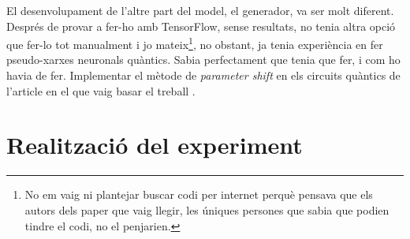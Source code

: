 El desenvolupament de l'altre part del model, el generador, va ser molt diferent. Després de provar a fer-ho amb TensorFlow, sense resultats, no tenia altra opció que fer-lo tot manualment i jo mateix\footnote{No em vaig ni plantejar buscar codi per internet perquè pensava que els autors dels paper que vaig llegir, les úniques persones que sabia que podien tindre el codi, no el penjarien.}, no obstant, ja tenia experiència en fer pseudo-xarxes neuronals quàntics. Sabia perfectament que tenia que fer, i com ho havia de fer. Implementar el mètode de \textit{parameter shift} en els circuits quàntics de l'article en el que vaig basar el treball \cite{QGAN_exp}. 






 
\chapter{Realització del experiment} 
 